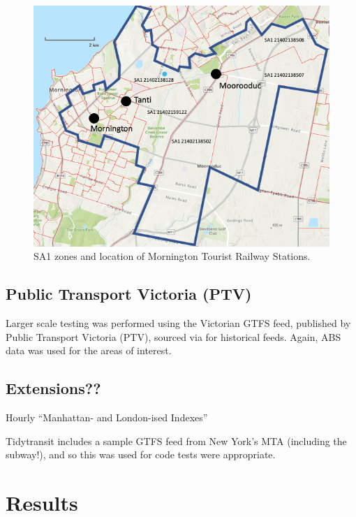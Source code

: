 \documentclass[preprint, 3p,
authoryear]{elsarticle} %
\begin{document}
\begin{figure}
\includegraphics[width=1\linewidth]{graphics/mornington} \caption{SA1 zones and location of Mornington Tourist Railway Stations.}\label{fig:mornington_map_ABS}
\end{figure}

\hypertarget{public-transport-victoria-ptv}{%
\subsection{Public Transport Victoria
(PTV)}\label{public-transport-victoria-ptv}}

Larger scale testing was performed using the Victorian GTFS feed,
published by Public Transport Victoria (PTV), sourced via
\citet{transitfeeds_victoria:2023aa} for historical feeds. Again, ABS
data was used for the areas of interest.

\hypertarget{extensions}{%
\subsection{Extensions??}\label{extensions}}

Hourly ``Manhattan- and London-ised Indexes''

Tidytransit includes a sample GTFS feed from New York's MTA (including
the subway!), and so this was used for code tests were appropriate.

\hypertarget{results}{%
\section{Results}\label{results}}
\end{document}
